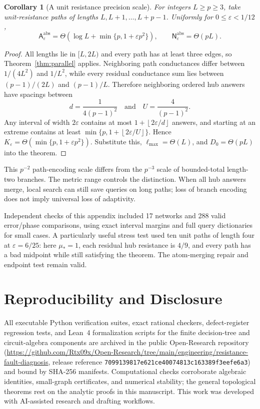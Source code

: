 \documentclass[11pt,letterpaper]{article}
\newtheorem{corollary}[theorem]{Corollary}
\newcommand{\floor}[1]{\left\lfloor #1\right\rfloor}
\newcommand{\A}{\mathsf A}
\newcommand{\N}{\mathsf N}
\begin{document}
\begin{corollary}[A unit resistance precision scale]\label{cor:unitprecision}
For integers $L\ge p\ge3$, take unit-resistance paths of lengths $L,L+1,\ldots,L+p-1$. Uniformly for $0\le\varepsilon<1/12$,
\[
 \A^{\mathrm{abs}}_\varepsilon
 =\Theta\!\left(\log L+\min\{p,1+\varepsilon p^2\}\right),
 \qquad
 \N^{\mathrm{abs}}_\varepsilon=\Theta(pL).
\]
\end{corollary}
\begin{proof}
All lengths lie in $[L,2L)$ and every path has at least three edges, so Theorem~\ref{thm:parallel} applies. Neighboring path conductances differ between $1/(4L^2)$ and $1/L^2$, while every residual conductance sum lies between $(p-1)/(2L)$ and $(p-1)/L$. Therefore neighboring ordered hub answers have spacings between
\[
 d=\frac1{4(p-1)^2}\quad\text{and}\quad U=\frac4{(p-1)^2}.
\]
Any interval of width $2\varepsilon$ contains at most $1+\floor{2\varepsilon/d}$ answers, and starting at an extreme contains at least $\min\{p,1+\floor{2\varepsilon/U}\}$. Hence $K_\varepsilon=\Theta(\min\{p,1+\varepsilon p^2\})$. Substitute this, $\ell_{\max}=\Theta(L)$, and $D_0=\Theta(pL)$ into the theorem.
\end{proof}

This $p^{-2}$ path-encoding scale differs from the $p^{-3}$ scale of bounded-total length-two branches. The metric range controls the distinction. When all hub answers merge, local search can still save queries on long paths; loss of branch encoding does not imply universal loss of adaptivity.

Independent checks of this appendix included 17 networks and 288 valid error/phase comparisons, using exact interval margins and full query dictionaries for small cases. A particularly useful stress test used ten unit paths of length four at $\varepsilon=6/25$: here $\mu_*=1$, each residual hub resistance is $4/9$, and every path has a bad midpoint while still satisfying the theorem. The atom-merging repair and endpoint test remain valid.


\section*{Reproducibility and Disclosure}
All executable Python verification suites, exact rational checkers, defect-register regression tests, and Lean~4 formalization scripts for the finite decision-tree and circuit-algebra components are archived in the public Open-Research repository (\url{https://github.com/Rtx09x/Open-Research/tree/main/engineering/resistance-fault-diagnosis}, release reference \texttt{7099139817e621ce40074813c163389f3eefe6a3}) and bound by SHA-256 manifests. Computational checks corroborate algebraic identities, small-graph certificates, and numerical stability; the general topological theorems rest on the analytic proofs in this manuscript. This work was developed with AI-assisted research and drafting workflows.
\end{document}
